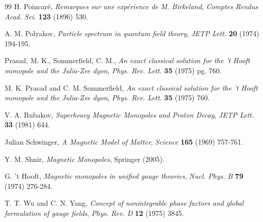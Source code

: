 \documentclass[a4paper,11pt]{article}
\begin{document}
\begin{thebibliography}{99}
H. Poincar\'e, \emph{Remarques sur une exp\'erience de M. Birkeland}, \emph{Comptes Rendus Acad. Sci.} {\bf 123} (1896) 530.

A. M. Polyakov, \emph{Particle spectrum in quantum field theory}, \emph{JETP Lett.} {\bf 20} (1974) 194-195.

Prasad, M. K., Sommerfield, C. M., \emph{An exact classical solution for the 't Hooft monopole and the Julia-Zee dyon}, \emph{Phys. Rev. Lett.} {\bf 35} (1975) pg. 760.

M. K. Prasad and C. M. Sommerfield, \emph{An exact classical solution for the 't Hooft monopole and the Julia-Zee dyon}, \emph{Phys. Rev. Lett.} {\bf 35} (1975) 760.

V. A. Rubakov, \emph{Superheavy Magnetic Monopoles and Proton Decay}, \emph{JETP Lett.} {\bf 33} (1981) 644.


Julian Schwinger, \emph{A Magnetic Model of Matter}, \emph{Science} {\bf 165} (1969) 757-761.

Y. M. Shnir, \emph{Magnetic Monopoles}, Springer (2005).

G. 't Hooft, \emph{Magnetic monopoles in unified gauge theories}, \emph{Nucl. Phys. B} {\bf 79} (1974) 276-284.

T. T. Wu and C. N. Yang, \emph{Concept of nonintegrable phase factors and global formulation of gauge fields}, \emph{Phys. Rev. D} {\bf 12} (1975) 3845.

\end{thebibliography}
\end{document}
